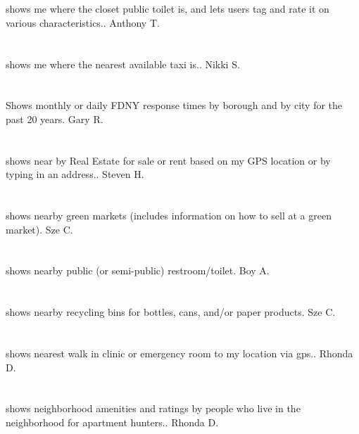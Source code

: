 \section{}shows me where the closet public toilet is,  and lets users tag and rate it on various characteristics.. Anthony T.
\section{} shows me where the nearest available taxi is.. Nikki S.
\section{}Shows monthly or daily FDNY response times by borough and by city for the past 20 years. Gary R.
\section{} shows near by Real Estate for sale or rent based on my GPS location or by typing in an address.. Steven H.
\section{}shows nearby green markets (includes information on how to sell at a green market). Sze C.
\section{}shows nearby public (or semi-public) restroom/toilet. Boy A.
\section{}shows nearby recycling bins for bottles,  cans,  and/or paper products. Sze C.
\section{}  shows nearest walk in clinic or emergency room to my location via gps.. Rhonda D.
\section{}shows neighborhood amenities and ratings by people who live in the neighborhood for apartment hunters.. Rhonda D.
